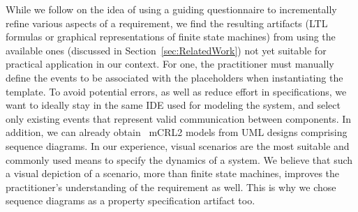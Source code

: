 \documentclass[letter]{llncs}
\begin{document}
While we follow 
on the idea of using a guiding questionnaire to incrementally refine various aspects
of a requirement, we find the resulting artifacts (LTL formulas or graphical representations of finite state machines) from using the available ones 
(discussed in Section~\ref{sec:RelatedWork}) not yet suitable for practical application in our context.
For one, the practitioner must manually define the events to be associated with the placeholders when 
instantiating the template. To avoid potential errors, as well as
reduce effort in specifications, we want to ideally stay in the same IDE used
for modeling the system, and select only existing events that represent
valid communication between components.  
In addition, we can already obtain~\cite{DBLP:dblp_conf/nfm/RemenskaTWHVCB13} mCRL2 models from UML designs comprising sequence diagrams.
In our experience, visual scenarios are the most suitable and commonly used  
means to specify the dynamics of a system. 
We believe that such a visual depiction of a scenario, more than finite state machines, 
improves the practitioner's understanding of the requirement as well. 
This is why we chose sequence diagrams as a property specification artifact too.
\end{document}

